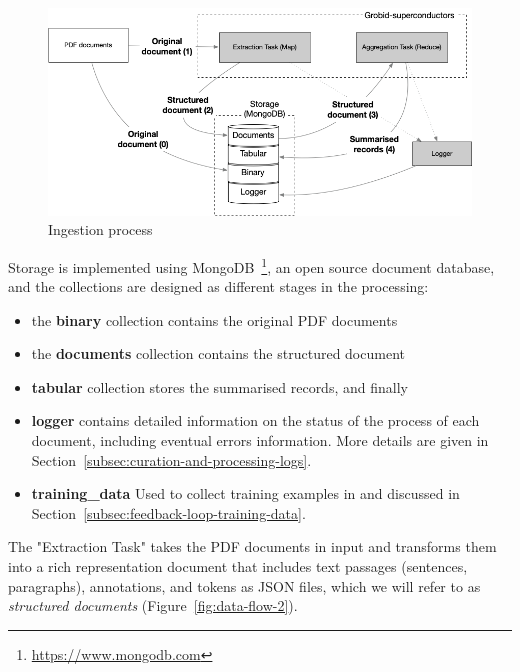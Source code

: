 \begin{figure}[htbp]
  \centering
  \includegraphics[width=\textwidth]{figures/curation/ingestion-schema.png} 
  \caption{Ingestion process}
  \label{fig:map-reduce}
\end{figure}

Storage is implemented using MongoDB~\footnote{\url{https://www.mongodb.com}}, an open source document database, and the collections are designed as different stages in the processing: 
\begin{itemize}
    \item the \textbf{binary} collection contains the original PDF documents 
    \item the \textbf{documents} collection contains the structured document
    \item \textbf{tabular} collection stores the summarised records, and finally 
    \item \textbf{logger} contains detailed information on the status of the process of each document, including eventual errors information. More details are given in Section~\ref{subsec:curation-and-processing-logs}.
    \item \textbf{training\_data} Used to collect training examples in and discussed in Section~\ref{subsec:feedback-loop-training-data}.
\end{itemize}


The "Extraction Task" takes the PDF documents in input and transforms them into a rich representation document that includes text passages (sentences, paragraphs), annotations, and tokens as JSON files, which we will refer to as \textit{structured documents} (Figure~\ref{fig:data-flow-2}). 

